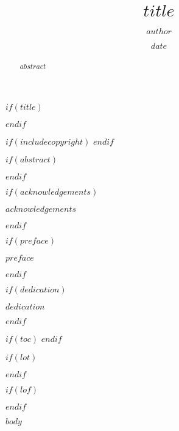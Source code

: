 \documentclass[12pt,twoside,openany]{reedthesis}
\title{$title$}
\author{$author$}
\date{$date$}
\renewcommand{\headrulewidth}{0pt} %
\begin{document}
\mainmatter %
\pagestyle{empty} %

$if(title)$
  \maketitle
$endif$

\pagestyle{fancy} %
\renewcommand{\headrulewidth}{0pt} %
\fancyhead[R]{\thepage}
\fancyhead[L,C]{}

$if(includecopyright)$
  \copyrightpage
$endif$

$if(abstract)$
  \begin{abstract}
    $abstract$
  \end{abstract}
$endif$


$if(acknowledgements)$
  \begin{acknowledgements}
    $acknowledgements$
  \end{acknowledgements}
$endif$

$if(preface)$
  \begin{preface}
    $preface$
  \end{preface}
$endif$

$if(dedication)$
  \begin{dedication}
    $dedication$
  \end{dedication}
$endif$

$if(toc)$
  \hypersetup{linkcolor=$if(toccolor)$$toccolor$$else$black$endif$}
  \setcounter{tocdepth}{$toc-depth$}
  \tableofcontents
$endif$

$if(lot)$
  \listoftables
$endif$

$if(lof)$
  \listoffigures
$endif$


$body$


\end{document}
